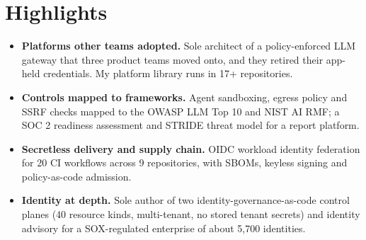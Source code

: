 \documentclass[10pt,letterpaper]{article}
\begin{document}
\section*{Highlights}
\begin{itemize}
\item \textbf{Platforms other teams adopted.} Sole architect of a policy-enforced LLM gateway that three product teams moved onto, and they retired their app-held credentials. My platform library runs in 17+ repositories.
\item \textbf{Controls mapped to frameworks.} Agent sandboxing, egress policy and SSRF checks mapped to the OWASP LLM Top 10 and NIST AI RMF; a SOC 2 readiness assessment and STRIDE threat model for a report platform.
\item \textbf{Secretless delivery and supply chain.} OIDC workload identity federation for 20 CI workflows across 9 repositories, with SBOMs, keyless signing and policy-as-code admission.
\item \textbf{Identity at depth.} Sole author of two identity-governance-as-code control planes (40 resource kinds, multi-tenant, no stored tenant secrets) and identity advisory for a SOX-regulated enterprise of about 5,700 identities.
\end{itemize}
\end{document}
